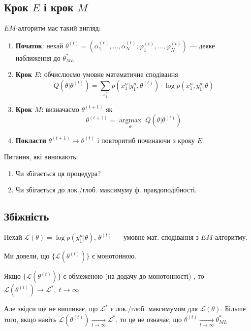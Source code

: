 \subsection{Крок $E$ і крок $M $}

$EM$-алгоритм має такий вигляд:

\begin{enumerate}
  \item \textbf{Початок}: нехай $\theta^{(t)} = \left( \alpha_1^{(t)}, \ldots, \alpha_N^{(t)};
    \varphi_1^{(t)}, \ldots, \varphi_N^{(t)}\right) $ --- деяке наближення до $\theta_{ML}^{*}$
  \item \textbf{Крок $E$:} обчислюємо умовне математичне сподівання
    \[ Q(\theta|\theta^{(t)}) = \sum_{x_1^{n}}^{} p\left( x_1^{n} | y_1^{n}, \theta^{(t)} \right) 
    \cdot \log p \left( x_1^{n}, y_1^{n} | \theta \right) \] 
  \item \textbf{Крок $M$:} визначаємо $\theta^{(t+1)}$ як 
    \[ \theta^{(t+1)} = \underset{\theta}{\operatorname{argmax}} \; Q\left( \theta | \theta^{(t)} \right)  \] 

  \item \textbf{Покласти} $\theta^{(t+1)} \mapsto \theta^{(t)}$ і повторитиб починаючи з кроку $E$.
\end{enumerate}

Питання, які виникають:
\begin{enumerate}
  \item Чи збігається ця процедура?
  \item Чи збігається до лок./глоб. максимуму ф. правдоподібності.
\end{enumerate}

\subsection{Збіжність}

Нехай $\mathcal{L}(\theta) = \log p\left( y_1^{n} | \theta \right)$,  $\theta^{(t)}$ --- умовне
мат. сподівання з $EM$-алгоритму.

Ми довели, що $\{\mathcal{L}\left( \theta^{(t)} \right) \} $ є монотонною.

Якщо  $\{\mathcal{L}\left( \theta^{(t)} \right) \} $ є обмеженою (на додачу до монотонності)
, то $\mathcal{L}\left( \theta^{(t)} \right) \to \mathcal{L}^{*}, \; t \to  \infty$

Але звідси ще не випливає, що $\mathcal{L}^{*}$ є лок./глоб. 
максимумом для $\mathcal{L}\left( \theta \right)$. Більше того, якщо навіть 
$\mathcal{L}\left( \theta^{(t)} \right) \underset{t \to  \infty}{\to } \mathcal{L}^{*}$,
то це не означає, що $\theta^{(t)} \underset{t \to  \infty}{\to } \theta_{ML}^{*}$

